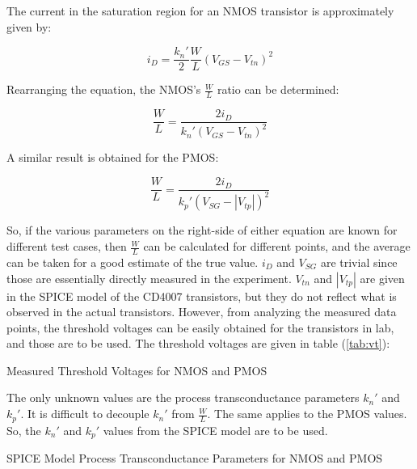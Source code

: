 
The current in the saturation region for an NMOS transistor is approximately given by:

\begin{equation}
	\label{eq:nmos_sat}
	i_{D} = \frac{k_{n}'}{2} \frac{W}{L} ( V_{GS} - V_{tn} )^{2}
\end{equation}

Rearranging the equation, the NMOS's $\frac{W}{L}$ ratio can be determined:

\begin{equation}
	\label{eq:w_over_l_nmos}
	\frac{W}{L} = \frac{2 i_{D}}{k_{n}' (V_{GS} - V_{tn})^{2}}
\end{equation}

A similar result is obtained for the PMOS:

\begin{equation}
	\label{eq:w_over_l_pmos}
	\frac{W}{L} = \frac{ 2 i_{D}}{k_{p}' (V_{SG} - |V_{tp}|)^{2}}
\end{equation}

So, if the various parameters on the right-side of either equation are known for different test cases, then $\frac{W}{L}$ can be calculated for different points, and the average can be taken for a good estimate of the true value.
$i_{D}$ and $V_{SG}$ are trivial since those are essentially directly measured in the experiment.
$V_{tn}$ and $|V_{tp}|$ are given in the SPICE model of the CD4007 transistors, but they do not reflect what is observed in the actual transistors.
However, from analyzing the measured data points, the threshold voltages can be easily obtained for the transistors in lab, and those are to be used.
The threshold voltages are given in table (\ref{tab:vt}):

\FloatBarrier

\begin{table}[h!]
	\centering
	\caption{Measured Threshold Voltages for NMOS and PMOS}
	\label{tab:vt}
\end{table}

\FloatBarrier

The only unknown values are the process transconductance parameters $k_{n}'$ and $k_{p}'$.
It is difficult to decouple $k_{n}'$ from $\frac{W}{L}$.
The same applies to the PMOS values.
So, the $k_{n}'$ and $k_{p}'$ values from the SPICE model are to be used.

\FloatBarrier

\begin{table}[h!]
	\centering
	\caption{SPICE Model Process Transconductance Parameters for NMOS and PMOS}
	\label{tab:k}
\end{table}

